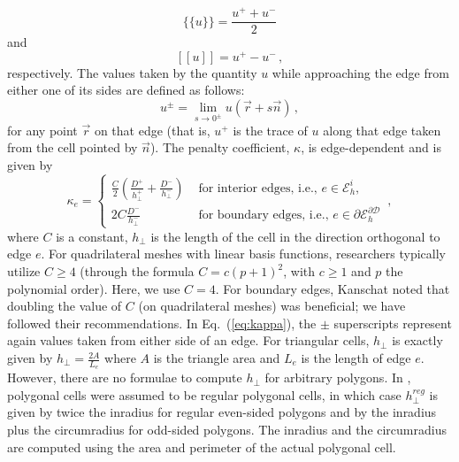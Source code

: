 \documentclass[preprint,10pt]{elsarticle}
\newcommand{\jmp}[1]{[\![#1]\!]}                     %
\newcommand{\mvl}[1]{\{\!\!\{#1\}\!\!\}}             %
\newcommand{\D}{\mathcal{D}}
\newcommand{\vr}{\vec{r}}
\newcommand{\vn}{\vec{n}}
\newcommand{\EI}{\mathcal{E}_h^i}
\newcommand{\reg}{\textit{reg}}
\newcommand{\eqt}[1]{Eq.~(\ref{#1})}                     %
\newcommand{\tf}{b}
\begin{document}
\begin{equation} \label{eq:mean}
\mvl{u} = \frac{u^+ + u^-}{2}
\end{equation}
and
\begin{equation} \label{eq:jump}
\jmp{u} = u^+ - u^- \, ,
\end{equation}
respectively.  The values taken by the quantity $u$ while approaching the edge from either one of its sides are defined as follows:
\begin{equation} \label{eq:upm}
u^\pm = \lim_{s\to 0^\pm} u(\vr + s \vn) \, ,
\end{equation}
for any point $\vr$ on that edge (that is, $u^+$ is the trace of $u$ along that edge taken from the cell pointed by $\vn$).
%
The penalty coefficient, $\kappa$, is edge-dependent and is given by
\begin{equation} \label{eq:kappa}
  \kappa_e = \left\{
    \begin{array}{ll}
      \frac{C}{2} \left( \frac{D^+}{h_\bot^+} + \frac{D^-}{h_\bot^-} \right) & \textrm{ for interior edges, i.e., } e \in \EI,\\
      2C \frac{D^-}{h_\bot^-}  & \textrm{ for boundary edges, i.e., } e \in \partial \mathcal{E}_h^{\partial\D}
    \end{array}
    \right. \, ,
\end{equation}
where $C$ is a constant, $h_{\bot}$ is the length of the cell in the direction 
orthogonal to edge $e$. 
For quadrilateral meshes with linear basis functions, researchers typically utilize $C \ge 4$ 
(through the formula $C=c(p+1)^2$, with $c\ge 1$ and $p$ the polynomial order). Here, we use $C=4$.
For boundary edges, 
Kanschat \cite{Kanschat2007} noted that doubling the value of $C$ (on quadrilateral meshes) was 
beneficial; we have followed their recommendations. In \eqt{eq:kappa}, the $\pm$ superscripts 
represent again values taken from either side of an edge. For triangular cells, $h_\bot$ is exactly 
given by $h_{\bot}=\frac{2A}{L_e}$ where $A$ is the triangle area and $L_e$ is the length of edge $e$. 
However, there are no formulae to compute $h_{\bot}$ for arbitrary polygons. In \cite{BT-PhD}, 
polygonal cells were assumed to be regular polygonal cells, in which case $h_{\bot}^\reg$ is given
by twice the inradius for regular even-sided polygons and by the inradius plus the 
circumradius for odd-sided polygons. The inradius and the circumradius are computed 
using the area and perimeter of the actual polygonal cell. 
\end{document}
